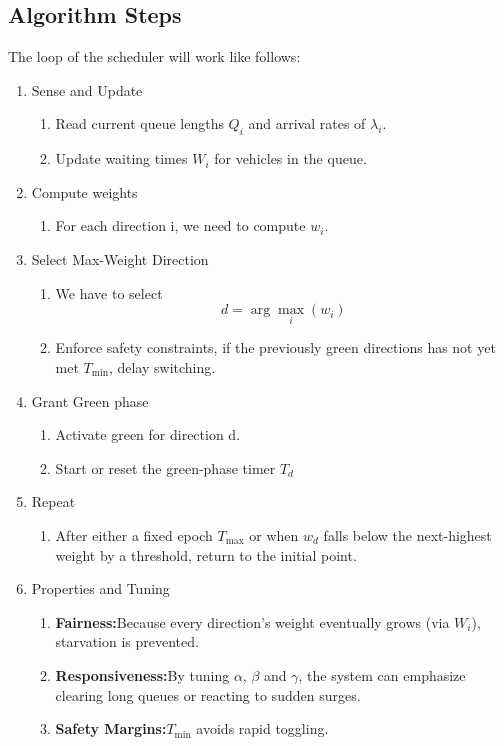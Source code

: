 \subsection{Algorithm Steps}
The loop of the scheduler will work like follows:
\begin{enumerate}
    \item Sense and Update
        \begin{enumerate}[label=(\alph*)]
            \item Read current queue lengths $Q_i$ and arrival rates of $\lambda_i$.
            \item Update waiting times $W_i$ for vehicles in the queue.
        \end{enumerate}
    \item Compute weights
        \begin{enumerate}[label=(\alph*)]
            \item For each direction i, we need to compute $w_i$.
        \end{enumerate}  
    \item Select Max-Weight Direction
            \begin{enumerate}[label=(\alph*)]
            \item We have to select \[d = \arg\max_i (w_i)\]
            \item Enforce safety constraints, if the previously green directions has not yet met $T_{\text{min}}$, delay switching.
            \end{enumerate}  
    \item Grant Green phase
            \begin{enumerate}[label=(\alph*)]
            \item Activate green for direction d.
            \item Start or reset the green-phase timer $T_d$
            \end{enumerate}  
    \item Repeat
            \begin{enumerate}[label=(\alph*)]
                \item After either a fixed epoch $T_{\text{max}}$ or when $w_d$ falls below the next-highest weight by a threshold, return to the initial point.
            \end{enumerate}  
    \item Properties and Tuning
            \begin{enumerate}[label=(\alph*)]
                \item \textbf{Fairness:}Because every direction’s weight eventually grows (via $W_i$), starvation is prevented.
                \item \textbf{Responsiveness:}By tuning $\alpha$, $\beta$ and $\gamma$, the system can emphasize clearing long queues or reacting to sudden surges.
                \item \textbf{Safety Margins:}$T_{\text{min}}$ avoids rapid toggling.
            \end{enumerate}
\end{enumerate}
